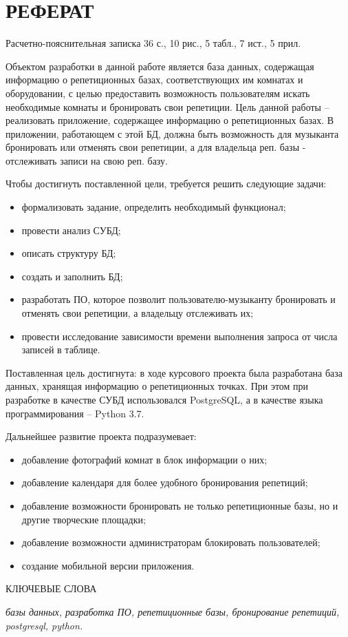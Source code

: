 \section*{РЕФЕРАТ}

Расчетно-пояснительная записка 36 с., 10 рис., 5 табл., 7 ист., 5 прил.

Объектом разработки в данной работе является база данных, содержащая информацию о репетиционных базах, соответствующих им комнатах и оборудовании, с целью предоставить возможность пользователям искать необходимые комнаты и бронировать свои репетиции. Цель данной работы – реализовать приложение, содержащее информацию о репетиционных базах. В приложении, работающем с этой БД, должна быть возможность для музыканта бронировать или отменять свои репетиции, а для владельца реп. базы - отслеживать записи на свою реп. базу.

Чтобы достигнуть поставленной цели, требуется решить следующие задачи:
\begin{itemize}
	\item формализовать задание, определить необходимый функционал;
	\item провести анализ СУБД;
	\item описать структуру БД;
	\item создать и заполнить БД;
	\item разработать ПО, которое позволит пользователю-музыканту бронировать и отменять свои репетиции, а владельцу отслеживать их;
	\item провести исследование зависимости времени выполнения запроса от числа записей в таблице.
\end{itemize}

Поставленная цель достигнута: в ходе курсового проекта была разработана база данных, хранящая информацию о репетиционных точках. При этом при разработке в качестве СУБД использовался PostgreSQL, а в качестве языка программирования – Python 3.7.

Дальнейшее развитие проекта подразумевает:
\begin{itemize}
	\item добавление фотографий комнат в блок информации о них;
	\item добавление календаря для более удобного бронирования репетиций;
	\item добавление возможности бронировать не только репетиционные базы, но и другие творческие площадки;
	\item добавление возможности администраторам блокировать пользователей;
	\item создание мобильной версии приложения.
\end{itemize}

КЛЮЧЕВЫЕ СЛОВА

\textit{базы данных, разработка ПО, репетиционные базы, бронирование репетиций, postgresql, python.}

\clearpage
